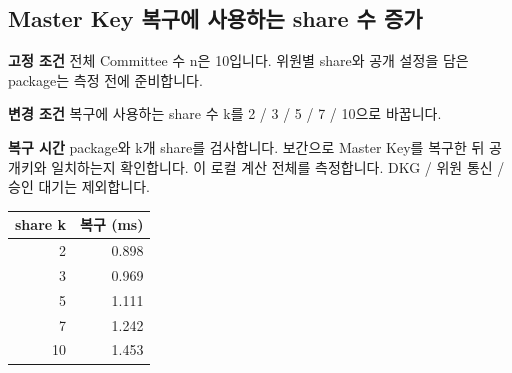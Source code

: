 \documentclass[11pt,a4paper]{article}
\begin{document}
\par\noindent\begin{minipage}{\linewidth}
\subsection*{Master Key 복구에 사용하는 share 수 증가}
\textbf{고정 조건}\newline
전체 Committee 수 n은 10입니다.\newline
위원별 share와 공개 설정을 담은 package는 측정 전에 준비합니다.\par\smallskip
\textbf{변경 조건}\newline
복구에 사용하는 share 수 k를 2 / 3 / 5 / 7 / 10으로 바꿉니다.\par\smallskip
\textbf{복구 시간}\newline
package와 k개 share를 검사합니다.\newline
보간으로 Master Key를 복구한 뒤 공개키와 일치하는지 확인합니다.\newline
이 로컬 계산 전체를 측정합니다.\newline
DKG / 위원 통신 / 승인 대기는 제외합니다.\par\smallskip
\begin{center}\small\begin{tabular}{@{}rr@{}}\toprule
\textbf{share k} & \textbf{복구 (ms)} \\
\midrule
2 & 0.898 \\
3 & 0.969 \\
5 & 1.111 \\
7 & 1.242 \\
10 & 1.453 \\
\bottomrule\end{tabular}\end{center}
\end{minipage}\par\medskip
\end{document}
